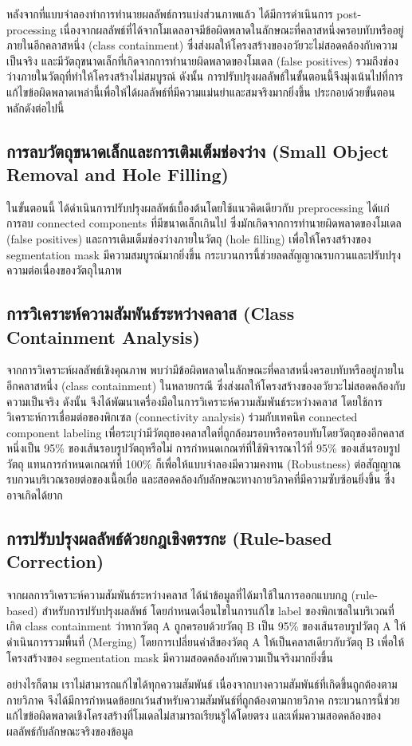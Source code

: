 หลังจากที่แบบจำลองทำการทำนายผลลัพธ์การแบ่งส่วนภาพแล้ว ได้มีการดำเนินการ post-processing เนื่องจากผลลัพธ์ที่ได้จากโมเดลอาจมีข้อผิดพลาดในลักษณะที่คลาสหนึ่งครอบทับหรืออยู่ภายในอีกคลาสหนึ่ง (class containment) 
ซึ่งส่งผลให้โครงสร้างของอวัยวะไม่สอดคล้องกับความเป็นจริง และมีวัตถุขนาดเล็กที่เกิดจากการทำนายผิดพลาดของโมเดล (false positives) รวมถึงช่องว่างภายในวัตถุที่ทำให้โครงสร้างไม่สมบูรณ์ ดังนั้น การปรับปรุงผลลัพธ์ในขั้นตอนนี้จึงมุ่งเน้นไปที่การแก้ไขข้อผิดพลาดเหล่านี้เพื่อให้ได้ผลลัพธ์ที่มีความแม่นยำและสมจริงมากยิ่งขึ้น ประกอบด้วยขั้นตอนหลักดังต่อไปนี้


\subsection{การลบวัตถุขนาดเล็กและการเติมเต็มช่องว่าง (Small Object Removal and Hole Filling)}

ในขั้นตอนนี้ ได้ดำเนินการปรับปรุงผลลัพธ์เบื้องต้นโดยใช้แนวคิดเดียวกับ preprocessing ได้แก่ การลบ connected components ที่มีขนาดเล็กเกินไป ซึ่งมักเกิดจากการทำนายผิดพลาดของโมเดล (false positives) และการเติมเต็มช่องว่างภายในวัตถุ (hole filling) เพื่อให้โครงสร้างของ segmentation mask มีความสมบูรณ์มากยิ่งขึ้น
กระบวนการนี้ช่วยลดสัญญาณรบกวนและปรับปรุงความต่อเนื่องของวัตถุในภาพ

\subsection{การวิเคราะห์ความสัมพันธ์ระหว่างคลาส (Class Containment Analysis)}

จากการวิเคราะห์ผลลัพธ์เชิงคุณภาพ พบว่ามีข้อผิดพลาดในลักษณะที่คลาสหนึ่งครอบทับหรืออยู่ภายในอีกคลาสหนึ่ง (class containment) ในหลายกรณี ซึ่งส่งผลให้โครงสร้างของอวัยวะไม่สอดคล้องกับความเป็นจริง
ดังนั้น จึงได้พัฒนาเครื่องมือในการวิเคราะห์ความสัมพันธ์ระหว่างคลาส โดยใช้การวิเคราะห์การเชื่อมต่อของพิกเซล (connectivity analysis) ร่วมกับเทคนิค connected component labeling เพื่อระบุว่ามีวัตถุของคลาสใดที่ถูกล้อมรอบหรือครอบทับโดยวัตถุของอีกคลาสหนึ่งเป็น 95\% ของเส้นรอบรูปวัตถุหรือไม่
การกำหนดเกณฑ์ที่ใช้พิจารณาไว้ที่ 95\% ของเส้นรอบรูปวัตถุ แทนการกำหนดเกณฑ์ที่ 100\% ก็เพื่อให้แบบจำลองมีความคงทน (Robustness) ต่อสัญญาณรบกวนบริเวณรอยต่อของเนื้อเยื่อ และสอดคล้องกับลักษณะทางกายวิภาคที่มีความซับซ้อนยิ่งขึ้น ซึ่งอาจเกิดได้ยาก

\subsection{การปรับปรุงผลลัพธ์ด้วยกฎเชิงตรรกะ (Rule-based Correction)}

จากผลการวิเคราะห์ความสัมพันธ์ระหว่างคลาส ได้นำข้อมูลที่ได้มาใช้ในการออกแบบกฎ (rule-based) สำหรับการปรับปรุงผลลัพธ์ โดยกำหนดเงื่อนไขในการแก้ไข label ของพิกเซลในบริเวณที่เกิด class containment
ว่าหากวัตถุ A ถูกครอบด้วยวัตถุ B เป็น 95\% ของเส้นรอบรูปวัตถุ A ให้ดำเนินการรวมพื้นที่ (Merging) โดยการเปลี่ยนค่าสีของวัตถุ A ให้เป็นคลาสเดียวกับวัตถุ B เพื่อให้โครงสร้างของ segmentation mask มีความสอดคล้องกับความเป็นจริงมากยิ่งขึ้น

อย่างไรก็ตาม เราไม่สามารถแก้ไขได้ทุกความสัมพันธ์ เนื่องจากบางความสัมพันธ์ที่เกิดขึ้นถูกต้องตามกายวิภาค จึงได้มีการกำหนดข้อยกเว้นสำหรับความสัมพันธ์ที่ถูกต้องตามกายวิภาค
กระบวนการนี้ช่วยแก้ไขข้อผิดพลาดเชิงโครงสร้างที่โมเดลไม่สามารถเรียนรู้ได้โดยตรง และเพิ่มความสอดคล้องของผลลัพธ์กับลักษณะจริงของข้อมูล